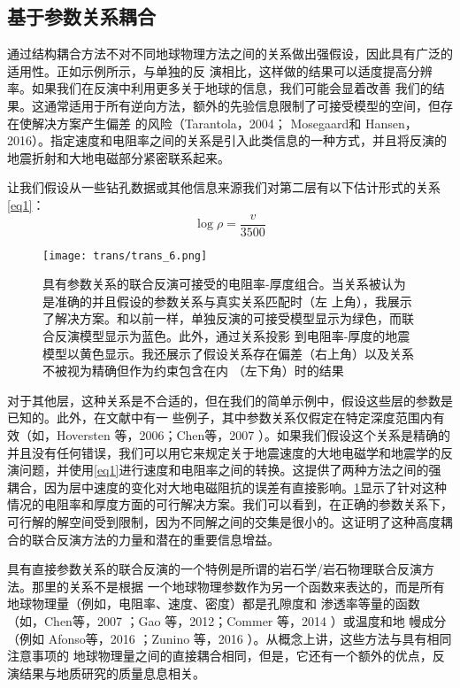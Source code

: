 \subsection{基于参数关系耦合}

通过结构耦合方法不对不同地球物理方法之间的关系做出强假设，因此具有广泛的适用性。正如示例所示，与单独的反 演相比，这样做的结果可以适度提高分辨率。如果我们在反演中利用更多关于地球的信息，我们可能会显着改善 我们的结果。这通常适用于所有逆向方法，额外的先验信息限制了可接受模型的空间，但存在使解决方案产生偏差 的风险（Tarantola，2004； Mosegaard和 Hansen，2016）。指定速度和电阻率之间的关系是引入此类信息的一种方式，并且将反演的地震折射和大地电磁部分紧密联系起来。

让我们假设从一些钻孔数据或其他信息来源我们对第二层有以下估计形式的关系\ref{eq1}：
\begin{equation}
    \log \rho = \frac{v}{3500} \label{eq1}
\end{equation}

\begin{figure}[]
    \centering
    \texttt{[image: trans/trans\_6.png]}
    \setcounter{figure}{5}
    \caption{具有参数关系的联合反演可接受的电阻率-厚度组合。当关系被认为是准确的并且假设的参数关系与真实关系匹配时（左 上角），我展示了解决方案。和以前一样，单独反演的可接受模型显示为绿色，而联合反演模型显示为蓝色。此外，通过关系投影 到电阻率-厚度的地震模型以黄色显示。我还展示了假设关系存在偏差（右上角）以及关系不被视为精确但作为约束包含在内 （左下角）时的结果}\label{trans6}

\end{figure}

对于其他层，这种关系是不合适的，但在我们的简单示例中，假设这些层的参数是已知的。此外，在文献中有一 些例子，其中参数关系仅假定在特定深度范围内有效（如，Hoversten 等，2006；Chen等，2007 ）。如果我们假设这个关系是精确的并且没有任何错误，我们可以用它来规定关于地震速度的大地电磁学和地震学的反演问题，并使用\ref{eq1}进行速度和电阻率之间的转换。这提供了两种方法之间的强耦合，因为层中速度的变化对大地电磁阻抗的误差有直接影响。\ref{trans6}显示了针对这种情况的电阻率和厚度方面的可行解决方案。我们可以看到，在正确的参数关系下，可行解的解空间受到限制，因为不同解之间的交集是很小的。这证明了这种高度耦合的联合反演方法的力量和潜在的重要信息增益。


具有直接参数关系的联合反演的一个特例是所谓的岩石学/岩石物理联合反演方法。那里的关系不是根据 一个地球物理参数作为另一个函数来表达的，而是所有地球物理量（例如，电阻率、速度、密度）都是孔隙度和 渗透率等量的函数（如，Chen等，2007 ；Gao 等，2012；Commer 等，2014 ）或温度和地 幔成分（例如 Afonso等，2016 ；Zunino 等，2016 ）。从概念上讲，这些方法与具有相同注意事项的 地球物理量之间的直接耦合相同，但是，它还有一个额外的优点，反演结果与地质研究的质量息息相关。

